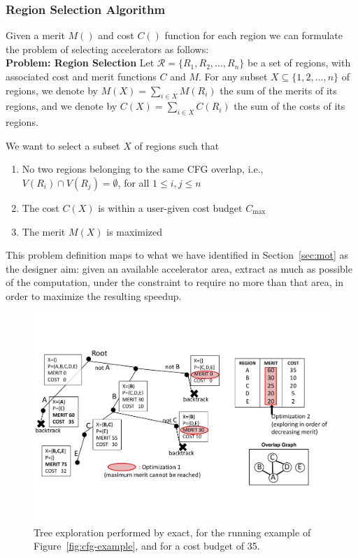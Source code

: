 \documentclass[]{usiinfthesis}
\newcommand{\exact}{\textsf{exact}}
\begin{document}
\subsubsection{Region Selection Algorithm}
\label{subsec:sel_algo}

Given a merit $M()$ and cost $C()$ function for each region 
we can formulate the problem of selecting accelerators as follows:\\
\textbf{Problem: Region Selection}
Let $\mathcal{R} = \{ R_1, R_2, \ldots, R_n \}$ be a set of regions,
with associated cost and merit functions $C$ and $M$.
For any subset $X\subseteq \{1,2,\ldots,n\}$ of regions,
we denote by $M(X) = \sum_{i\in X} M(R_i)$ the sum of the merits of
its regions, and we denote by $C(X) = \sum_{i\in X} C(R_i)$ the sum of
the costs of its regions.

We want to select a subset $X$ of regions such that
\begin{enumerate}
\item No two regions belonging to the same CFG overlap, i.e.,
  $V(R_i)\cap V(R_j) = \emptyset$, for all $1\le i,j\le n$
\item The cost $C(X)$ is within a user-given cost budget $C_{\max}$
\item The merit $M(X)$ is maximized
\end{enumerate}


This problem definition maps to what we have identified in
Section~\ref{sec:mot} as the designer aim: given an available
accelerator area, extract as much as possible of the computation,
under the constraint to require no more than that area, in order to
maximize the resulting speedup.\par

\begin{figure}[t]
\centering
\includegraphics[width= .9 \linewidth]{Figs/exact_tree.pdf}
\caption{Tree exploration performed by \exact, for the running example
  of Figure~\ref{fig:cfg-example}, and for a cost budget of 35.}
\label{fig:exact_tree}
\end{figure}
\end{document}
